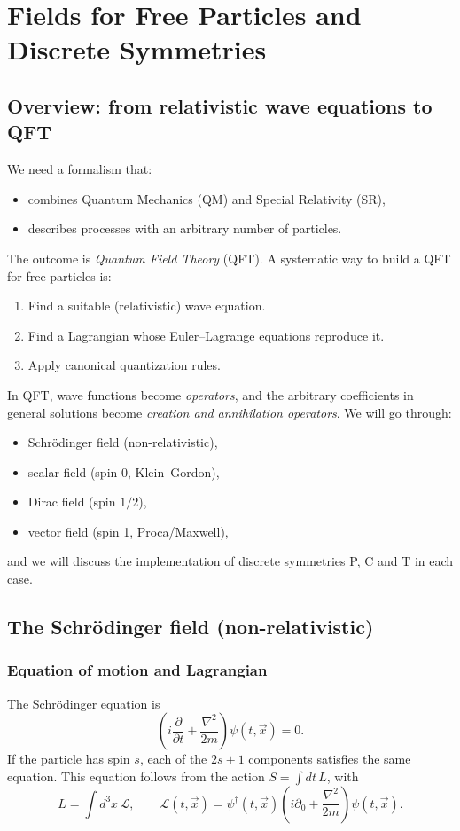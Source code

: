 \chapter{Fields for Free Particles and Discrete Symmetries}

\section{Overview: from relativistic wave equations to QFT}
We need a formalism that:
\begin{itemize}
  \item combines Quantum Mechanics (QM) and Special Relativity (SR),
  \item describes processes with an arbitrary number of particles.
\end{itemize}
The outcome is \emph{Quantum Field Theory} (QFT). A systematic way to build a QFT for free particles is:
\begin{enumerate}
  \item Find a suitable (relativistic) wave equation.
  \item Find a Lagrangian whose Euler--Lagrange equations reproduce it.
  \item Apply canonical quantization rules.
\end{enumerate}
In QFT, wave functions become \emph{operators}, and the arbitrary coefficients in general solutions
become \emph{creation and annihilation operators}. We will go through:
\begin{itemize}
  \item Schr\"odinger field (non-relativistic),
  \item scalar field (spin 0, Klein--Gordon),
  \item Dirac field (spin $1/2$),
  \item vector field (spin 1, Proca/Maxwell),
\end{itemize}
and we will discuss the implementation of discrete symmetries P, C and T in each case.

\section{The Schr\"odinger field (non-relativistic)}
\subsection{Equation of motion and Lagrangian}
The Schr\"odinger equation is
\begin{equation}
\left(i\frac{\partial}{\partial t}+\frac{\nabla^2}{2m}\right)\psi(t,\vec x)=0.
\end{equation}
If the particle has spin $s$, each of the $2s+1$ components satisfies the same equation.
This equation follows from the action $S=\int dt\,L$, with
\begin{equation}
L=\int d^3x\,\mathcal L,\qquad
\mathcal L(t,\vec x)=\psi^\dagger(t,\vec x)\left(i\partial_0+\frac{\nabla^2}{2m}\right)\psi(t,\vec x).
\end{equation}

